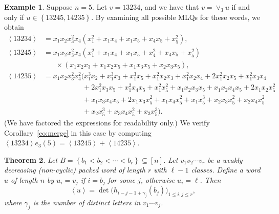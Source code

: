 \documentclass[submission]{FPSAC2018}
\newcommand{\swt}[1]{\left\langle #1 \right\rangle} %
\newcommand{\merge}[2]{\vee_{#1}#2} %
\newcommand{\set}[1]{\left\{ #1 \right\}}
\newcommand{\ive}[1]{\left[ #1 \right]}
\theoremstyle{plain}
\newtheorem{thm}{Theorem}[section]
\theoremstyle{definition}
\newtheorem{example}[thm]{Example}
\numberwithin{equation}{section}
\begin{document}
\begin{example}
Suppose $n = 5$.
Let $v = 13234$, and we have that $v = \merge{3}{u}$ if and only if $u \in \set{13245, 14235}$.
By examining all possible MLQs for these words, we obtain
\begin{align*}
\swt{13234} & = x_1 x_2 x_3^2 x_4 (x_1^2 + x_1 x_4 + x_1 x_5 + x_4 x_5 + x_5^2),
\\ \swt{13245} & = x_1 x_2 x_3^2 x_4 (x_1^2 + x_1x_4 + x_1x_5 + x_4^2 + x_4x_5 + x_5^2)
\\ & \hspace{20pt} \times (x_1x_2x_3 + x_1x_2x_5+x_1x_3x_5+x_2x_3x_5),
\\ \swt{14235} & = x_1x_2x_3^2x_4^2 (x_1^3x_2 + x_1^3x_3 + x_1^3x_5 + x_1^2x_2x_3 + x_1^2x_2x_4 + 2x_1^2x_2x_5 + x_1^2x_3x_4
\\ & \hspace{65pt} + 2x_1^2x_3x_5 + x_1^2x_4x_5 + x_1^2x_5^2 + x_1x_2x_3x_5 + x_1x_2x_4x_5 + 2x_1x_2x_5^2
\\ & \hspace{65pt} + x_1x_3x_4x_5 + 2x_1x_3x_5^2 + x_1x_4x_5^2 + x_1x_5^3 + x_2x_3x_5^2 + x_2x_4x_5^2
\\ & \hspace{65pt} + x_2x_5^3 + x_3x_4x_5^2 + x_3x_5^3).
\end{align*}
(We have factored the expressions for readability only.)
We verify Corollary~\ref{co:merge} in this case by computing $\swt{13234} e_3(5) = \swt{13245} + \swt{14235}$.
\end{example}


\begin{thm}
\label{thm:determinant_form}
  Let $B = \set{b_1 < b_2 < \cdots < b_r} \subseteq \ive{n}$.
  Let $v_1v_2 \dotsm v_r$ be a weakly decreasing (non-cyclic) packed word of length $r$ with $\ell-1$ classes.
  Define a word $u$ of length $n$ by $u_i = v_j$ if $i = b_j$ for some $j$, otherwise $u_i = \ell$.
  Then
  \[
  \swt{u} = \det\bigl( h_{i-j-1+\gamma_j}(b_j) \bigr)_{1\leq i,j\leq r},
  \]
  where $\gamma_j$ is the number of distinct letters in $v_1 \dotsm v_j$.
\end{thm}
\end{document}
